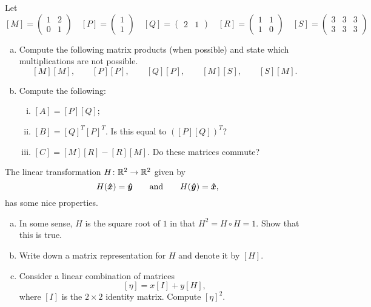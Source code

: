 \documentclass[12pt]{article} %
\begin{document}
\begin{problem}
Let
\vspace*{.25cm}
\[
[M]= \begin{pmatrix} 1 & 2\\ 0 & 1 \end{pmatrix} \quad 
[P]=\begin{pmatrix} 1 \\ 1 \end{pmatrix} \quad 
[Q]=\begin{pmatrix} 2 & 1 \end{pmatrix} \quad
[R] = \begin{pmatrix} 1 & 1 \\ 1 & 0 \end{pmatrix} \quad
[S]=\begin{pmatrix} 3 & 3 & 3 \\ 3 & 3 & 3 \end{pmatrix}
\]
\vspace*{.25cm}
\begin{enumerate}[(a)]
    \item Compute the following matrix products (when possible) and state which multiplications are not possible.
\[
[M][M], \qquad [P][P], \qquad [Q][P], \qquad [M][S], \qquad [S][M].
\]
    \item Compute the following:
    \begin{enumerate}[i.]
        \item $[A]=[P][Q]$;
        \item $[B]=[Q]^T[P]^T$. Is this equal to $([P][Q])^T$?
        \item $[C] = [M][R] - [R][M]$. Do these matrices commute?
    \end{enumerate}
\end{enumerate}
\end{problem}

\begin{problem}
    The linear transformation $H\colon \mathbb{R}^2 \to \mathbb{R}^2$ given by
    \[
        H(\boldsymbol{\hat{x}}) = \boldsymbol{\hat{y}} \qquad \textrm{and} \qquad H(\boldsymbol{\hat{y}}) = \boldsymbol{\hat{x}},
    \]
    has some nice properties. 
    \begin{enumerate}[(a)]
        \item In some sense, $H$ is the square root of $1$ in that $H^2 = H \circ H = 1$. Show that this is true.
        \item Write down a matrix representation for $H$ and denote it by $[H]$.
        \item Consider a linear combination of matrices 
        \[
            [\eta] = x[I] + y[H],
        \]
        where $[I]$ is the $2\times 2$ identity matrix. Compute $[\eta]^2$.  
    \end{enumerate} 
\end{problem}
\end{document}
